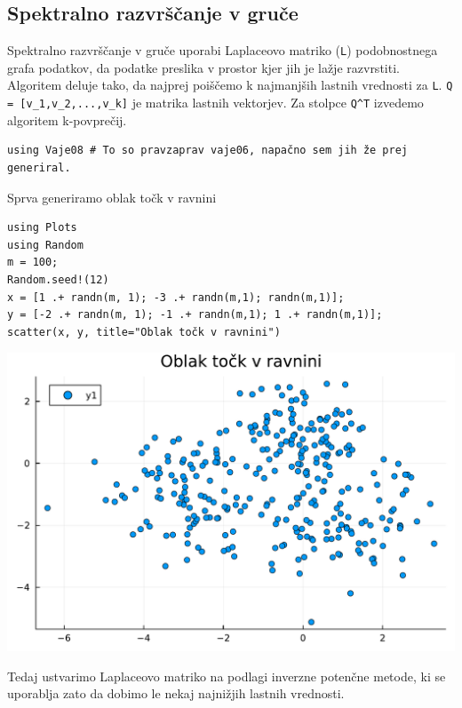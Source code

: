 \documentclass[12pt,a4paper]{article}
\begin{document}
\subsection{Spektralno razvrščanje v gruče}
Spektralno razvrščanje v gruče uporabi Laplaceovo matriko (\texttt{L}) podobnostnega grafa podatkov, da podatke preslika v prostor kjer jih je lažje razvrstiti. Algoritem deluje tako, da najprej poiščemo k najmanjših lastnih vrednosti za \texttt{L}. \texttt{Q = [v\_1,v\_2,...,v\_k]} je matrika lastnih vektorjev. Za stolpce \texttt{Q\^{}T} izvedemo algoritem k-povprečij.


\begin{verbatim}
using Vaje08 # To so pravzaprav vaje06, napačno sem jih že prej generiral.
\end{verbatim}

Sprva generiramo oblak točk v ravnini


\begin{verbatim}
using Plots
using Random
m = 100;
Random.seed!(12)
x = [1 .+ randn(m, 1); -3 .+ randn(m,1); randn(m,1)];
y = [-2 .+ randn(m, 1); -1 .+ randn(m,1); 1 .+ randn(m,1)];
scatter(x, y, title="Oblak točk v ravnini")
\end{verbatim}
\includegraphics[width=\linewidth]{jl_Y5bBlk/demo_2_1.pdf}

Tedaj ustvarimo Laplaceovo matriko na podlagi inverzne potenčne metode, ki se uporablja zato da dobimo le nekaj najnižjih lastnih vrednosti.
\end{document}

